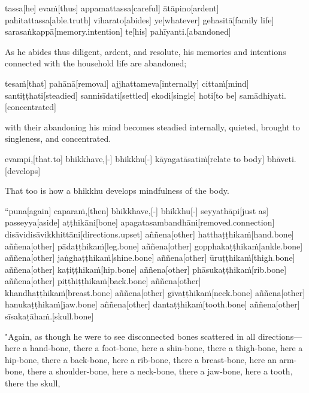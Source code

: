 \begin{samepage}
\begingl[glneveryline={\PaliGlossA,\PaliGlossB}]
tassa[he] evaṁ[thus] appamattassa[careful] ātāpino[ardent] pahitattassa[able.truth] viharato[abides] ye[whatever] gehasitā[family life] sarasaṅkappā[memory.intention] te[his] pahīyanti.[abandoned]
\endgl
\nopagebreak
\linespread{0.5}
\begin{spacin}{0.2}
{\PaliGlossFT As he abides thus diligent, ardent, and resolute, his memories and intentions connected with the household life are abandoned;}
\end{spacin}
\vskip 12pt
\end{samepage}
\begin{samepage}
\begingl[glneveryline={\PaliGlossA,\PaliGlossB}]
tesaṁ[that] pahānā[removal] ajjhattameva[internally] cittaṁ[mind] santiṭṭhati[steadied] sannisīdati[settled] ekodi[single] hoti[to be] samādhiyati.[concentrated]
\endgl
\nopagebreak
\linespread{0.5}
\begin{spacin}{0.2}
{\PaliGlossFT with their abandoning his mind becomes steadied internally, quieted, brought to singleness, and concentrated.}
\end{spacin}
\vskip 12pt
\end{samepage}
\begin{samepage}
\begingl[glneveryline={\PaliGlossA,\PaliGlossB}]
evampi,[that.to] bhikkhave,[-] bhikkhu[-] kāyagatāsatiṁ[relate to body] bhāveti.[develops]
\endgl
\nopagebreak
\linespread{0.5}
\begin{spacin}{0.2}
{\PaliGlossFT That too is how a bhikkhu develops mindfulness of the body.}
\end{spacin}
\vskip 12pt
\end{samepage}
\vskip 0.2in
\begin{samepage}
\begingl[glneveryline={\PaliGlossA,\PaliGlossB}]
“puna[again] caparaṁ,[then] bhikkhave,[-] bhikkhu[-] seyyathāpi[just as] passeyya[aside] aṭṭhikāni[bone] apagatasambandhāni[removed.connection] disāvidisāvikkhittāni[directions.upset] aññena[other] hatthaṭṭhikaṁ[hand.bone] aññena[other] pādaṭṭhikaṁ[leg.bone] aññena[other] gopphakaṭṭhikaṁ[ankle.bone] aññena[other] jaṅghaṭṭhikaṁ[shine.bone] aññena[other] ūruṭṭhikaṁ[thigh.bone] aññena[other] kaṭiṭṭhikaṁ[hip.bone] aññena[other] phāsukaṭṭhikaṁ[rib.bone] aññena[other] piṭṭhiṭṭhikaṁ[back.bone] aññena[other] khandhaṭṭhikaṁ[breast.bone] aññena[other] gīvaṭṭhikaṁ[neck.bone] aññena[other] hanukaṭṭhikaṁ[jaw.bone] aññena[other] dantaṭṭhikaṁ[tooth.bone] aññena[other] sīsakaṭāhaṁ.[skull.bone]
\endgl
\nopagebreak
\linespread{0.5}
\begin{spacin}{0.2}
{\PaliGlossFT "Again, as though he were to see disconnected bones scattered in all directions—here a hand-bone, there a foot-bone, here a shin-bone, there a thigh-bone, here a hip-bone, there a back-bone, here a rib-bone, there a breast-bone, here an arm-bone, there a shoulder-bone, here a neck-bone, there a jaw-bone, here a tooth, there the skull,}
\end{spacin}
\vskip 12pt
\end{samepage}
